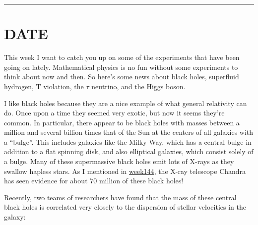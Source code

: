 \documentclass{article}
\renewcommand{\texttt}[1]{%
  \begingroup
  \ttfamily
  \begingroup\lccode`~=`/\lowercase{\endgroup\def~}{/\discretionary{}{}{}}%
  \begingroup\lccode`~=`[\lowercase{\endgroup\def~}{[\discretionary{}{}{}}%
  \begingroup\lccode`~=`.\lowercase{\endgroup\def~}{.\discretionary{}{}{}}%
  \catcode`/=\active\catcode`[=\active\catcode`.=\active
  \scantokens{#1\noexpand}%
  \endgroup
}
\begin{document}
\begin{center}\rule{0.5\linewidth}{0.5pt}\end{center}
\hypertarget{week156}{%
\section{DATE}\label{week156}}

This week I want to catch you up on some of the experiments that have
been going on lately. Mathematical physics is no fun without some
experiments to think about now and then. So here's some news about black
holes, superfluid hydrogen, T violation, the \(\tau\) neutrino, and the
Higgs boson.

I like black holes because they are a nice example of what general
relativity can do. Once upon a time they seemed very exotic, but now it
seems they're common. In particular, there appear to be black holes with
masses between a million and several billion times that of the Sun at
the centers of all galaxies with a ``bulge''. This includes galaxies
like the Milky Way, which has a central bulge in addition to a flat
spinning disk, and also elliptical galaxies, which consist solely of a
bulge. Many of these supermassive black holes emit lots of X-rays as
they swallow hapless stars. As I mentioned in
\href{week144.html}{week144}, the X-ray telescope Chandra has seen
evidence for about 70 million of these black holes!

Recently, two teams of researchers have found that the mass of these
central black holes is correlated very closely to the dispersion of
stellar velocities in the galaxy:

\end{document}
